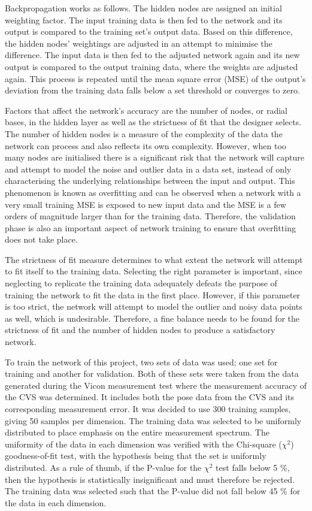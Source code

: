 Backpropagation works as follows. The hidden nodes are assigned an initial weighting factor. The input training data is then fed to the network and its output is compared to the training set's output data. Based on this difference, the hidden nodes' weightings are adjusted in an attempt to minimise the difference. The input data is then fed to the adjusted network again and its new output is compared to the output training data, where the weights are adjusted again. This process is repeated until the mean square error (MSE) of the output's deviation from the training data falls below a set threshold or converges to zero. 

Factors that affect the network's accuracy are the number of nodes, or radial bases, in the hidden layer as well as the strictness of fit that the designer selects. The number of hidden nodes is a measure of the complexity of the data the network can process and also reflects its own complexity. However, when too many nodes are initialised there is a significant risk that the network will capture and attempt to model the noise and outlier data in a data set, instead of only characterising the underlying relationships between the input and output. This phenomenon is known as overfitting and can be observed when a network with a very small training MSE is exposed to new input data and the MSE is a few orders of magnitude larger than for the training data. Therefore, the validation phase is also an important aspect of network training to ensure that overfitting does not take place. 

The strictness of fit measure determines to what extent the network will attempt to fit itself to the training data. Selecting the right parameter is important, since neglecting to replicate the training data adequately defeats the purpose of training the network to fit the data in the first place. However, if this parameter is too strict, the network will attempt to model the outlier and noisy data points as well, which is undesirable. Therefore, a fine balance needs to be found for the strictness of fit and the number of hidden nodes to produce a satisfactory network.  

To train the network of this project, two sets of data was used; one set for training and another for validation. Both of these sets were taken from the data generated during the Vicon measurement test where the measurement accuracy of the CVS was determined. It includes both the pose data from the CVS and its corresponding measurement error. It was decided to use 300 training samples, giving 50 samples per dimension. The training data was selected to be uniformly distributed to place emphasis on the entire measurement spectrum. The uniformity of the data in each dimension was verified with the Chi-square ($\chi^2$) goodness-of-fit test, with the hypothesis being that the set is uniformly distributed. As a rule of thumb, if the P-value for the $\chi^2$ test falls below 5 \%, then the hypothesis is statistically insignificant and must therefore be rejected. The training data was selected such that the P-value did not fall below 45 \% for the data in each dimension. 

